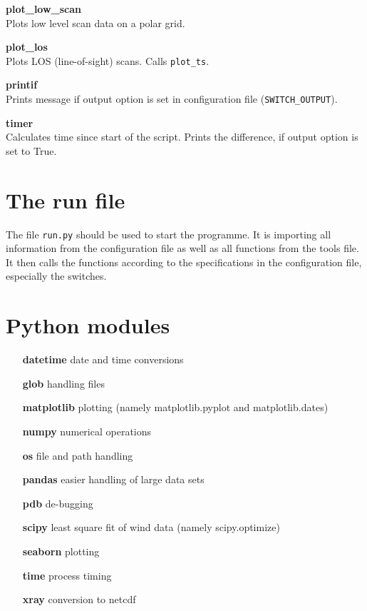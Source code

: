 \documentclass[a4paper]{scrartcl}
\begin{document}
\textbf{plot\_low\_scan}\\
Plots low level scan data on a polar grid.

\textbf{plot\_los}\\
Plots LOS (line-of-sight) scans. Calls \verb/plot_ts/.

\textbf{printif}\\
Prints message if output option is set in configuration file (\verb/SWITCH_OUTPUT/).

\textbf{timer}\\
Calculates time since start of the script. Prints the difference, if output option is set to True.



\section{The run file}
The file \verb/run.py/ should be used to start the programme. It is importing all information from the configuration file as well as all functions from the tools file. It then calls the functions according to the specifications in the configuration file, especially the switches.


\section{Python modules}

\begin{itemize}
	\item[\textbf{datetime}] date and time conversions
	\item[\textbf{glob}] handling files
	\item[\textbf{matplotlib}] plotting (namely matplotlib.pyplot and matplotlib.dates)
	\item[\textbf{numpy}] numerical operations
	\item[\textbf{os}] file and path handling
	\item[\textbf{pandas}] easier handling of large data sets
	\item[\textbf{pdb}] de-bugging
	\item[\textbf{scipy}] least square fit of wind data (namely scipy.optimize)
	\item[\textbf{seaborn}] plotting
	\item[\textbf{time}] process timing
	\item[\textbf{xray}] conversion to netcdf
\end{itemize}
\end{document}
